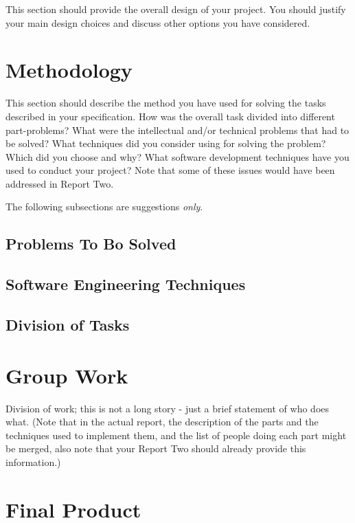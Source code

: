 \documentclass[a4paper,11pt]{article}
\begin{document}
This section should provide the overall design of your project.
You should justify your main design choices and discuss other options you have considered. 


\clearpage
\section{Methodology}

This section should describe the method you have used for solving the tasks
described in your specification. How was the overall task divided into different
part-problems? What were the intellectual and/or technical problems that had 
to be solved? What techniques did you consider using for solving the problem? 
Which did you choose and why? What software development techniques have you 
used to conduct your project? Note that some of these issues would have been 
addressed in Report Two.

The following subsections are suggestions \emph{only}.

\subsection{Problems To Bo Solved}

\subsection{Software Engineering Techniques}

\subsection{Division of Tasks}


\clearpage
\section{Group Work}

Division of work; this is not a long story - just a brief statement of who does what.
(Note that in the actual report, the description of the parts and the techniques used
to implement them, and the list of people doing each part might be merged, also note
that your Report Two should already provide this information.) 


\clearpage
\section{Final Product}
\end{document}
